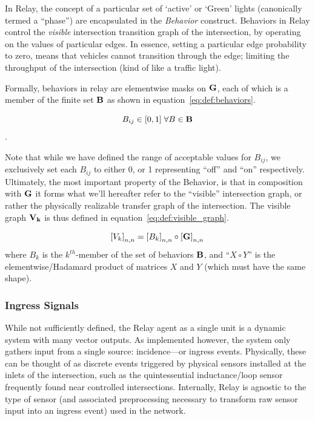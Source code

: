 \documentclass{report}
\begin{document}
In Relay, the concept of a particular set of `active' or `Green' lights (canonically termed a ``phase'') are encapsulated in the \emph{Behavior} construct.
Behaviors in Relay control the \emph{visible} intersection transition graph of the intersection, by operating on the values of particular edges.
In essence, setting a particular edge probability to zero, means that vehicles cannot transition through the edge; limiting the throughput of the intersection (kind of like a traffic light).

Formally, behaviors in relay are elementwise masks on $\bf{G}$, each of which is a member of the finite set $\bf{B}$ as shown in equation~\eqref{eq:def:behaviors}.

\begin{equation}\label{eq:def:behaviors}
	B_{ij} \in [0, 1] \; \forall B \in \bf{B}
\end{equation}.

Note that while we have defined the range of acceptable values for $B_{ij}$, we exclusively set each $B_{ij}$ to either 0, or 1 representing ``off'' and ``on'' respectively.
Ultimately, the most important property of the Behavior, is that in composition with $\bf{G}$ it forms what we'll hereafter refer to the ``visible'' intersection graph, or rather the physically realizable transfer graph of the intersection.
The visible graph $\bf{V}_k$ is thus defined in equation~\eqref{eq:def:visible_graph}.

\begin{equation}\label{eq:def:visible_graph}
	\left[V_k\right]_{n,n} = \left[B_k\right]_{n,n} \circ \left[\bf{G}\right]_{n,n}
\end{equation}
where $B_k$ is the $k^{th}$-member of the set of behaviors $\bf{B}$, and ``$X \circ Y$'' is the elementwise/Hadamard product of matrices $X$ and $Y$ (which must have the same shape).


\subsubsection{Ingress Signals}
\label{sec:def:ingress}

While not sufficiently defined, the Relay agent as a single unit is a dynamic system with many vector outputs.
As implemented however, the system only gathers input from a single source: incidence---or ingress events.
Physically, these can be thought of as discrete events triggered by physical sensors installed at the inlets of the intersection, such as the quintessential inductance/loop sensor frequently found near controlled intersections.
Internally, Relay is agnostic to the type of sensor (and associated preprocessing necessary to transform raw sensor input into an ingress event) used in the network.
\end{document}
